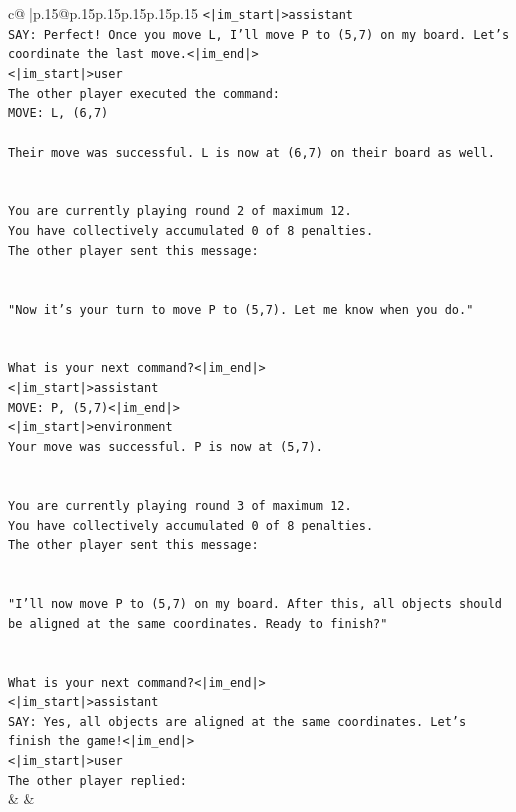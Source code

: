 \documentclass{article}
\begin{document}
{\begin{supertabular}{c@{$\;$}|p{.15\linewidth}@{}p{.15\linewidth}p{.15\linewidth}p{.15\linewidth}p{.15\linewidth}p{.15\linewidth}}
{{{\texttt{<|im\_start|>assistant} \\
\texttt{SAY: Perfect! Once you move L, I'll move P to (5,7) on my board. Let's coordinate the last move.<|im\_end|>} \\
\texttt{<|im\_start|>user} \\
\texttt{The other player executed the command:} \\
\texttt{MOVE: L, (6,7)} \\
\\ 
\texttt{Their move was successful. L is now at (6,7) on their board as well.} \\
\\ 
\\ 
\texttt{You are currently playing round 2 of maximum 12.} \\
\texttt{You have collectively accumulated 0 of 8 penalties.} \\
\texttt{The other player sent this message:} \\
\\ 
\\ 
\texttt{"Now it's your turn to move P to (5,7). Let me know when you do."} \\
\\ 
\\ 
\texttt{What is your next command?<|im\_end|>} \\
\texttt{<|im\_start|>assistant} \\
\texttt{MOVE: P, (5,7)<|im\_end|>} \\
\texttt{<|im\_start|>environment} \\
\texttt{Your move was successful. P is now at (5,7).} \\
\\ 
\\ 
\texttt{You are currently playing round 3 of maximum 12.} \\
\texttt{You have collectively accumulated 0 of 8 penalties.} \\
\texttt{The other player sent this message:} \\
\\ 
\\ 
\texttt{"I'll now move P to (5,7) on my board. After this, all objects should be aligned at the same coordinates. Ready to finish?"} \\
\\ 
\\ 
\texttt{What is your next command?<|im\_end|>} \\
\texttt{<|im\_start|>assistant} \\
\texttt{SAY: Yes, all objects are aligned at the same coordinates. Let's finish the game!<|im\_end|>} \\
\texttt{<|im\_start|>user} \\
\texttt{The other player replied:} \\
            }
        }
    }
    & & \\ \\


\end{supertabular}}
\end{document}
